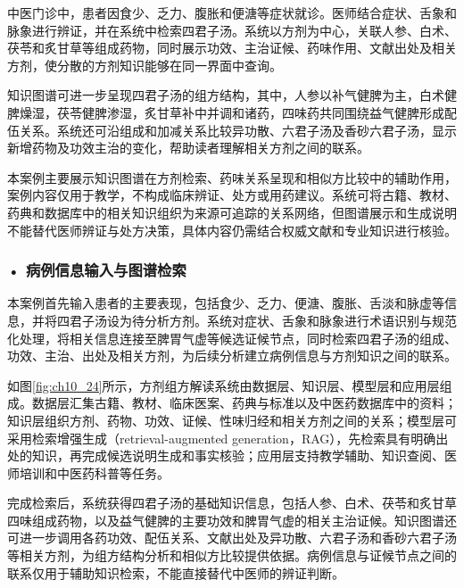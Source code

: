 中医门诊中，患者因食少、乏力、腹胀和便溏等症状就诊。医师结合症状、舌象和脉象进行辨证，并在系统中检索四君子汤。系统以方剂为中心，关联人参、白术、茯苓和炙甘草等组成药物，同时展示功效、主治证候、药味作用、文献出处及相关方剂，使分散的方剂知识能够在同一界面中查询。

知识图谱可进一步呈现四君子汤的组方结构，其中，人参以补气健脾为主，白术健脾燥湿，茯苓健脾渗湿，炙甘草补中并调和诸药，四味药共同围绕益气健脾形成配伍关系。系统还可沿组成和加减关系比较异功散、六君子汤及香砂六君子汤，显示新增药物及功效主治的变化，帮助读者理解相关方剂之间的联系。

本案例主要展示知识图谱在方剂检索、药味关系呈现和相似方比较中的辅助作用，案例内容仅用于教学，不构成临床辨证、处方或用药建议。系统可将古籍、教材、药典和数据库中的相关知识组织为来源可追踪的关系网络，但图谱展示和生成说明不能替代医师辨证与处方决策，具体内容仍需结合权威文献和专业知识进行核验。


\subsubsection*{\textbf{• 病例信息输入与图谱检索}}

本案例首先输入患者的主要表现，包括食少、乏力、便溏、腹胀、舌淡和脉虚等信息，并将四君子汤设为待分析方剂。系统对症状、舌象和脉象进行术语识别与规范化处理，将相关信息连接至脾胃气虚等候选证候节点，同时检索四君子汤的组成、功效、主治、出处及相关方剂，为后续分析建立病例信息与方剂知识之间的联系。

如图\ref{fig:ch10_24}所示，方剂组方解读系统由数据层、知识层、模型层和应用层组成。数据层汇集古籍、教材、临床医案、药典与标准以及中医药数据库中的资料；知识层组织方剂、药物、功效、证候、性味归经和相关方剂之间的关系；模型层可采用检索增强生成（retrieval-augmented generation，RAG），先检索具有明确出处的知识，再完成候选说明生成和事实核验；应用层支持教学辅助、知识查阅、医师培训和中医药科普等任务。

\par
\noindent\begin{minipage}{\textwidth}
\centering
{}
\label{fig:ch10_24}
\end{minipage}
\par

完成检索后，系统获得四君子汤的基础知识信息，包括人参、白术、茯苓和炙甘草四味组成药物，以及益气健脾的主要功效和脾胃气虚的相关主治证候。知识图谱还可进一步调用各药功效、配伍关系、文献出处及异功散、六君子汤和香砂六君子汤等相关方剂，为组方结构分析和相似方比较提供依据。病例信息与证候节点之间的联系仅用于辅助知识检索，不能直接替代中医师的辨证判断。


